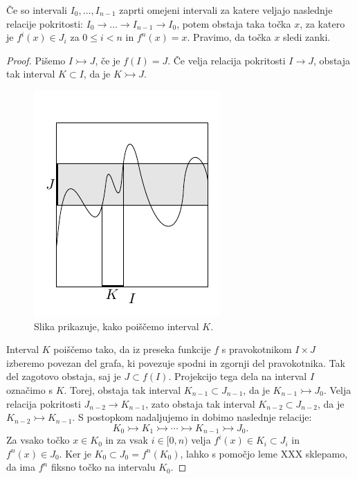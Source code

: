 \documentclass[mat2]{fmfdelo}
\begin{document}
\begin{lema}\label{lem:zanka}
Če so intervali $I_0, \dots, I_{n-1}$ zaprti omejeni intervali za katere veljajo naslednje relacije pokritosti: $I_0 \to \dots \to I_{n-1} \to I_0$, potem obstaja taka točka $x$, za katero je $f^{i}(x) \in J_i$ za $0 \leq i < n$ in $f^n(x)=x$. Pravimo, da točka $x$ sledi zanki.
\end{lema}

\begin{proof}
Pišemo $I \rightarrowtail J$, če je $f(I) = J$. Če velja relacija pokritosti $I \to J$, obstaja tak interval $K \subset I$, da je $K \rightarrowtail J$.
\begin{figure}[h]
  \centering
  \includegraphics[]{images/bezje.pdf}
  \caption[Primer vektorske slike.]{Slika prikazuje, kako poiščemo interval $K$.}
  \label{fig:bezje}
\end{figure}
Interval $K$ poiščemo tako, da iz preseka funkcije $f$ s pravokotnikom $I \times J$ izberemo povezan del grafa, ki povezuje spodni in zgornji del pravokotnika. Tak del zagotovo obstaja, saj je $J \subset f(I)$. Projekcijo tega dela na interval $I$ označimo s $K$. Torej, obstaja tak interval $K_{n-1} \subset J_{n-1}$, da je $K_{n-1} \rightarrowtail J_0$. Velja relacija pokritosti $J_{n-2} \to K_{n-1}$, zato obstaja tak interval $K_{n-2} \subset J_{n-2}$, da je $K_{n-2} \rightarrowtail K_{n-1}$. S postopkom nadaljujemo in dobimo naslednje relacije:
$$K_0 \rightarrowtail K_1 \rightarrowtail \cdots \rightarrowtail K_{n-1} \rightarrowtail J_0.$$
Za vsako točko $x \in K_0$ in za vsak $i \in [0, n)$ velja $f^i(x) \in K_i \subset J_i$ in $f^n(x) \in J_0$. Ker je $K_0 \subset J_0 = f^n(K_0)$, lahko s pomočjo leme XXX sklepamo, da ima $f^n$ fiksno točko na intervalu $K_0$.
\end{proof}
\end{document}
